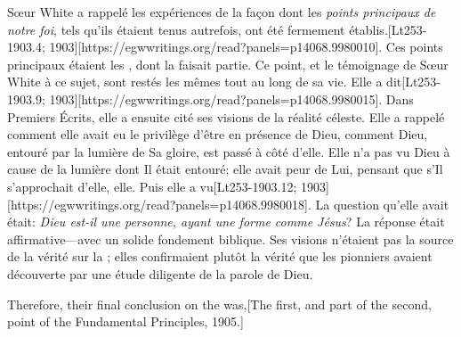 Sœur White a rappelé les expériences de la façon dont les \textit{points principaux de notre foi}, tels qu'ils étaient tenus autrefois, ont été fermement établis.[Lt253-1903.4; 1903][https://egwwritings.org/read?panels=p14068.9980010]. Ces points principaux étaient les , dont la  faisait partie. Ce point, et le témoignage de Sœur White à ce sujet, sont restés les mêmes tout au long de sa vie. Elle a dit[Lt253-1903.9; 1903][https://egwwritings.org/read?panels=p14068.9980015]. Dans Premiers Écrits, elle a ensuite cité ses visions de la réalité céleste. Elle a rappelé comment elle avait eu le privilège d'être en présence de Dieu, comment Dieu, entouré par la lumière de Sa gloire, est passé à côté d'elle. Elle n'a pas vu Dieu à cause de la lumière dont Il était entouré; elle avait peur de Lui, pensant que s'Il s'approchait d'elle, elle. Puis elle a vu[Lt253-1903.12; 1903][https://egwwritings.org/read?panels=p14068.9980018]. La question qu'elle avait était: \textit{Dieu est-il une personne, ayant une forme comme Jésus}? La réponse était affirmative—avec un solide fondement biblique. Ses visions n'étaient pas la source de la vérité sur la ; elles confirmaient plutôt la vérité que les pionniers avaient découverte par une étude diligente de la parole de Dieu.


Therefore, their final conclusion on the  was,[The first, and part of the second, point of the Fundamental Principles, 1905.]


